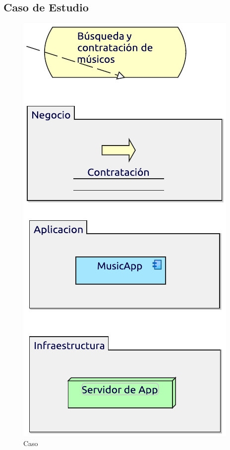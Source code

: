 \subsection{Caso de Estudio}

\begin{figure}[hbt!]
	\centering
	\includegraphics[width=0.5\linewidth]{Arquitectura/Tecnologia/imgs/capas.pdf}
	\caption{Caso}
\end{figure}

\newpage